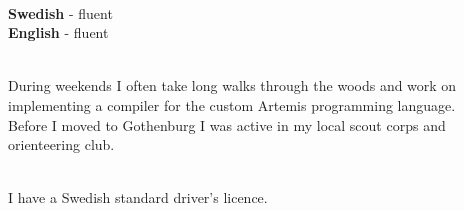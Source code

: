 \documentclass[9pt]{developercv}
\begin{document}
\begin{minipage}[t]{0.2\textwidth}
	\vspace{-\baselineskip}
	\\
	\textbf{Swedish} - fluent\\
	\textbf{English} - fluent
\end{minipage}
\hfill
\begin{minipage}[t]{0.4\textwidth}
	\vspace{-\baselineskip}
	\\During weekends I often take long walks through the woods and work
	on implementing a compiler for the custom Artemis programming language.
	\\Before I moved to Gothenburg I was active in my local scout corps and
	orienteering club.
\end{minipage}
\hfill
\begin{minipage}[t]{0.3\textwidth}
	\vspace{-\baselineskip}
	\\I have a Swedish standard driver's licence.
\end{minipage}
\end{document}
